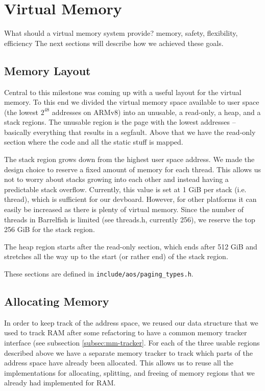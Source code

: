 \chapter{Virtual Memory}
What should a virtual memory system provide? memory, safety, flexibility, efficiency
The next sections will describe how we achieved these goals.

\section{Memory Layout}
Central to this milestone was coming up with a useful layout for the virtual memory. To this end
we divided the virtual memory space available to user space (the lowest $2^{48}$ addresses on ARMv8)
into an unusable, a read-only, a heap, and
a stack regions. The unusable region is the page with the lowest addresses -- basically everything
that results in a segfault. Above that we have the read-only section where the code and all the static stuff %
is mapped.

The stack region grows down from the highest user space address. We made the design
choice to reserve a fixed amount of memory for each thread. This allows us not to worry
about stacks growing into each other and instead having a predictable stack overflow.
Currently, this value is set at 1 GiB per stack (i.e. thread), which is sufficient for our devboard.
However, for other platforms it can easily be increased as there is plenty of virtual memory.
Since the number of threads in Barrelfish is limited (see threads.h, currently 256), we
reserve the top 256 GiB for the stack region.

The heap region starts after the read-only section, which ends after 512 GiB and stretches all the way
up to the start (or rather end) of the stack region.

These sections are defined in \texttt{include/aos/paging\_types.h}.

\section{Allocating Memory}
In order to keep track of the address space, we reused our data structure that we used to track
RAM after some refactoring to have a common memory tracker interface (see subsection \ref{subsec:mm-tracker}.
For each of the three usable
regions described above we have a separate memory tracker to track which parts of the address space
have already been allocated. This allows us to reuse all the implementations for allocating, splitting,
and freeing of memory regions that we already had implemented for RAM.

